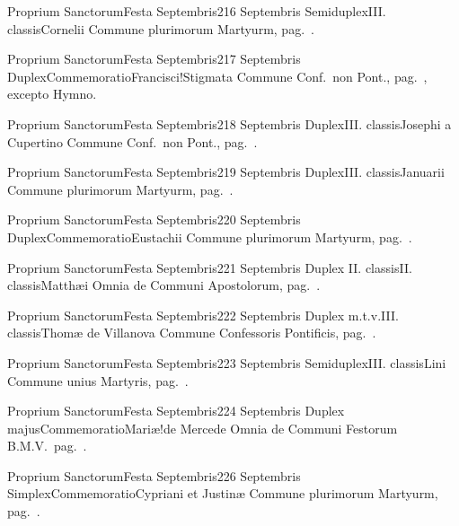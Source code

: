 \documentclass[liber-responsorialis.tex]{subfiles}
\begin{document}
	{Proprium Sanctorum}{Festa Septembris}{2}{16 Septembris}
	{Semiduplex}{III. classis}{Cornelii}
	{Commune plurimorum Martyurm, pag.\ \pageref{M-PMEX}.}
	{}

	{Proprium Sanctorum}{Festa Septembris}{2}{17 Septembris}
	{Duplex}{Commemoratio}{Francisci!Stigmata}
	{Commune Conf.\ non Pont., pag.\ \pageref{M-CONP}, excepto Hymno.}
	{}

	{Proprium Sanctorum}{Festa Septembris}{2}{18 Septembris}
	{Duplex}{III. classis}{Josephi a Cupertino}
	{Commune Conf.\ non Pont., pag.\ \pageref{M-CONP}.}
	{}

	{Proprium Sanctorum}{Festa Septembris}{2}{19 Septembris}
	{Duplex}{III. classis}{Januarii}
	{Commune plurimorum Martyurm, pag.\ \pageref{M-PMEX}.}
	{}

	{Proprium Sanctorum}{Festa Septembris}{2}{20 Septembris}
	{Duplex}{Commemoratio}{Eustachii}
	{Commune plurimorum Martyurm, pag.\ \pageref{M-PMEX}.}
	{}

	{Proprium Sanctorum}{Festa Septembris}{2}{21 Septembris}
	{Duplex II. classis}{II. classis}{Matthæi}
	{Omnia de Communi Apostolorum, pag.\ \pageref{M-APEX}.}
	{}

	{Proprium Sanctorum}{Festa Septembris}{2}{22 Septembris}
	{Duplex m.t.v.}{III. classis}{Thomæ de Villanova}
	{Commune Confessoris Pontificis, pag.\ \pageref{M-COPO}.}
	{}

	{Proprium Sanctorum}{Festa Septembris}{2}{23 Septembris}
	{Semiduplex}{III. classis}{Lini}
	{Commune unius Martyris, pag.\ \pageref{M-UMEX}.}
	{}

	{Proprium Sanctorum}{Festa Septembris}{2}{24 Septembris}
	{Duplex majus}{Commemoratio}{Mariæ!de Mercede}
	{Omnia de Communi Festorum B.M.V.\ pag.\ \pageref{M-CBMV}.}
	{}

	{Proprium Sanctorum}{Festa Septembris}{2}{26 Septembris}
	{Simplex}{Commemoratio}{Cypriani et Justinæ}
	Commune plurimorum Martyurm, pag.\ \pageref{M-PMEX}.{}
	{}
\end{document}
